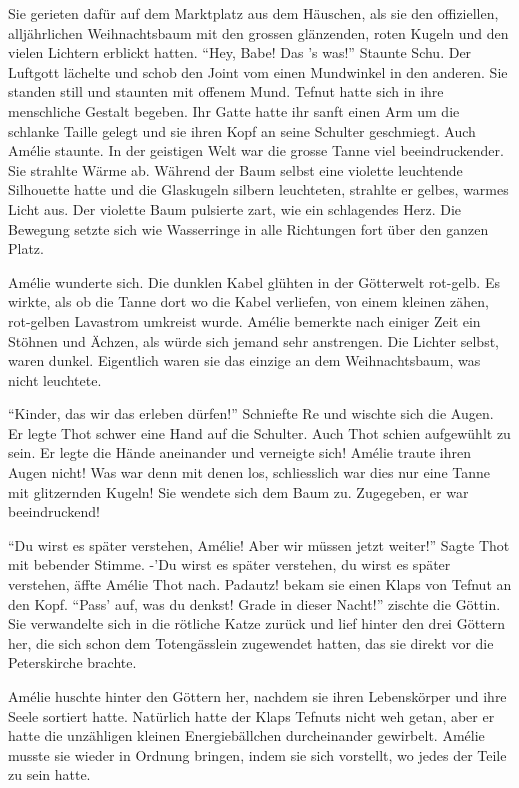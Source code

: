 \documentclass[11pt,titlepage,a5paper]{book}
\begin{document}
Sie gerieten dafür auf dem Marktplatz aus dem Häuschen, als sie den offiziellen, alljährlichen Weihnachtsbaum mit den grossen glänzenden, roten Kugeln und den vielen Lichtern erblickt hatten. "`Hey, Babe! Das 's was!"' Staunte Schu. Der Luftgott lächelte und schob den Joint vom einen Mundwinkel in den anderen. Sie standen still und staunten mit offenem Mund. Tefnut hatte sich in ihre menschliche Gestalt begeben. Ihr Gatte hatte ihr sanft einen Arm um die schlanke Taille gelegt und sie ihren Kopf an seine Schulter geschmiegt. Auch Amélie staunte. In der geistigen Welt war die grosse Tanne viel beeindruckender. Sie strahlte Wärme ab. Während der Baum selbst eine violette leuchtende Silhouette hatte und die Glaskugeln silbern leuchteten, strahlte er gelbes, warmes Licht aus. Der violette Baum pulsierte zart, wie ein schlagendes Herz. Die Bewegung setzte sich wie Wasserringe in alle Richtungen fort über den ganzen Platz.

Amélie wunderte sich. Die dunklen Kabel glühten in der Götterwelt rot-gelb. Es wirkte, als ob die Tanne dort wo die Kabel verliefen, von einem kleinen zähen, rot-gelben Lavastrom umkreist wurde. Amélie bemerkte nach einiger Zeit ein Stöhnen und Ächzen, als würde sich jemand sehr anstrengen. Die Lichter selbst, waren dunkel. Eigentlich waren sie das einzige an dem Weihnachtsbaum, was nicht leuchtete.

"`Kinder, das wir das erleben dürfen!"' Schniefte Re und wischte sich die Augen. Er legte Thot schwer eine Hand auf die Schulter. Auch Thot schien aufgewühlt zu sein. Er legte die Hände aneinander und verneigte sich! Amélie traute ihren Augen nicht! Was war denn mit denen los, schliesslich war dies nur eine Tanne mit glitzernden Kugeln! Sie wendete sich dem Baum zu. Zugegeben, er war beeindruckend! 

"`Du wirst es später verstehen, Amélie! Aber wir müssen jetzt weiter!"' Sagte Thot mit bebender Stimme. -'Du wirst es später verstehen, du wirst es später verstehen, äffte Amélie Thot nach. Padautz! bekam sie einen Klaps von Tefnut an den Kopf. "`Pass' auf, was du denkst! Grade in dieser Nacht!"' zischte die Göttin. Sie verwandelte sich in die rötliche Katze zurück und lief hinter den drei Göttern her, die sich schon dem Totengässlein zugewendet hatten, das sie direkt vor die Peterskirche brachte.

Amélie huschte hinter den Göttern her, nachdem sie ihren Lebenskörper und ihre Seele sortiert hatte. Natürlich hatte der Klaps Tefnuts nicht weh getan, aber er hatte die unzähligen kleinen Energiebällchen durcheinander gewirbelt. Amélie musste sie wieder in Ordnung bringen, indem sie sich vorstellt, wo jedes der Teile zu sein hatte. 
\end{document}
